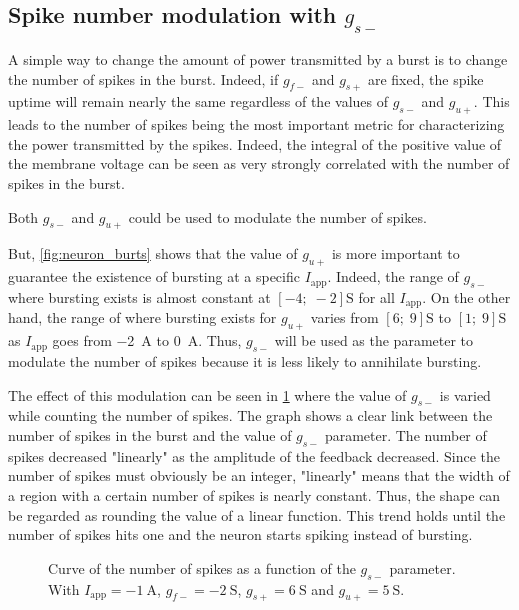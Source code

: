 \subsection{Spike number modulation with $g_{s-}$}\label{sec:spike_mod}

A simple way to change the amount of power transmitted by a burst is to change the number of spikes in the burst.
Indeed, if $g_{f-}$ and $g_{s+}$ are fixed, the spike uptime will remain nearly the same regardless of the values of $g_{s-}$ and $g_{u+}$.
This leads to the number of spikes being the most important metric for characterizing the power transmitted by the spikes.
Indeed, the integral of the positive value of the membrane voltage can be seen as very strongly correlated with the number of spikes in the burst.

Both $g_{s-}$ and $g_{u+}$ could be used to modulate the number of spikes. 

But, \cref{fig:neuron_burts} shows that the value of $g_{u+}$ is more important to guarantee the existence of bursting at a specific $I_\text{app}$.
Indeed, the range of $g_{s-}$ where bursting exists is almost constant at $\left[-4;\;-2\right]\unit{\siemens}$ for all $I_\text{app}$.
On the other hand, the range of where bursting exists for $g_{u+}$ varies from $\left[6;\;9\right]\unit{\siemens}$ to $\left[1;\;9\right]\unit{\siemens}$ as $I_\text{app}$ goes from \qty{-2}{\ampere} to \qty{0}{\ampere}.
Thus, $g_{s-}$ will be used as the parameter to modulate the number of spikes because it is less likely to annihilate bursting.

The effect of this modulation can be seen in \cref{fig:neuron_burst_spikes} where the value of $g_{s-}$ is varied while counting the number of spikes.
The graph shows a clear link between the number of spikes in the burst and the value of $g_{s-}$ parameter.
The number of spikes decreased "linearly" as the amplitude of the feedback decreased.
Since the number of spikes must obviously be an integer, "linearly" means that the width of a region with a certain number of spikes is nearly constant.
Thus, the shape can be regarded as rounding the value of a linear function.
This trend holds until the number of spikes hits one and the neuron starts spiking instead of bursting.

\begin{figure}[!htb]
    \centering
    \caption{Curve of the number of spikes as a function of the $g_{s-}$ parameter. With $I_\text{app} = \qty{-1}{\ampere}$, $g_{f-} = \qty{-2}{\siemens}$, $g_{s+} = \qty{6}{\siemens}$ and $g_{u+} = \qty{5}{\siemens}$.}
    \label{fig:neuron_burst_spikes}
\end{figure}

